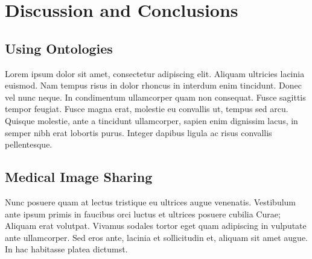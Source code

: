 
\chapter{Discussion and Conclusions} %

\label{Chapter6} %



\section{Using Ontologies}

Lorem ipsum dolor sit amet, consectetur adipiscing elit. Aliquam
ultricies lacinia euismod. Nam tempus risus in dolor rhoncus in
interdum enim tincidunt. Donec vel nunc neque. In condimentum
ullamcorper quam non consequat. Fusce sagittis tempor feugiat. Fusce
magna erat, molestie eu convallis ut, tempus sed arcu. Quisque
molestie, ante a tincidunt ullamcorper, sapien enim dignissim lacus,
in semper nibh erat lobortis purus. Integer dapibus ligula ac risus
convallis pellentesque.


\section{Medical Image Sharing}

Nunc posuere quam at lectus tristique eu ultrices augue
venenatis. Vestibulum ante ipsum primis in faucibus orci luctus et
ultrices posuere cubilia Curae; Aliquam erat volutpat. Vivamus sodales
tortor eget quam adipiscing in vulputate ante ullamcorper. Sed eros
ante, lacinia et sollicitudin et, aliquam sit amet augue. In hac
habitasse platea dictumst.
